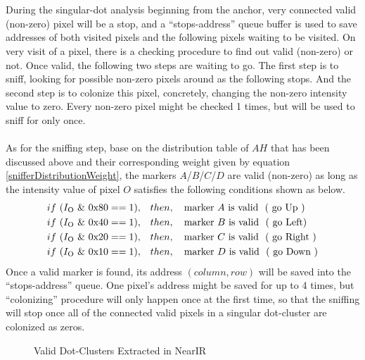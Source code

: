 \\\\%
During the singular-dot analysis beginning from the anchor, very connected valid (non-zero) pixel will be a stop, and a \enquote{stops-address} queue buffer is used to save addresses of both visited pixels and the following pixels waiting to be visited. On very visit of a pixel, there is a checking procedure to find out valid (non-zero) or not. Once valid, the following two steps are waiting to go. The first step is to sniff, looking for possible non-zero pixels around as the following stops. And the second step is to colonize this pixel, concretely, changing the non-zero intensity value to zero. Every non-zero pixel might be checked 1 times, but will be used to sniff for only once.%
\\\\%
As for the sniffing step, base on the distribution table of \(A\)\texttildelow \(H\) that has been discussed above and their corresponding weight given by equation \ref{snifferDistributionWeight}, the markers \(A\)/\(B\)/\(C\)/\(D\) are valid (non-zero) as long as the intensity value of pixel \(O\) satisfies the following conditions shown as below.%
%
\begin{equation}
%
\begin{aligned}
if \,\, ( I_{\text{O}} \,\, \& \,\, \text{0x80}  == 1 ),\quad &then, \quad \text{marker } A\,\, \text{is valid \,\,( go Up )}%
\\%
if \,\, ( I_{\text{O}} \,\, \& \,\, \text{0x40}  == 1 ),\quad &then, \quad \text{marker } B\,\, \text{is valid \,\,( go  Left)}%
\\%
if \,\, ( I_{\text{O}} \,\, \& \,\, \text{0x20}  == 1 ),\quad &then, \quad \text{marker } C\,\,\text{is valid \,\,( go Right )}%
\\%
if \,\, ( I_{\text{O}} \,\, \& \,\, \text{0x10}  == 1 ),\quad &then,\quad \text{marker } D\,\,\text{is valid \,\,( go Down )}%
\\%
\end{aligned}
%
\end{equation}%
%
Once a valid marker is found, its address \((column, row)\) will be saved into the \enquote{stops-address} queue. One pixel's address might be saved for up to 4 times, but \enquote{colonizing} procedure will only happen once at the first time, so that the sniffing will stop once all of the connected valid pixels in a singular dot-cluster are colonized as zeros.%
\par%
%
 \begin{figure}[h]
\hspace*{-0.5cm}
\centering
{}
{}
%
\caption{Valid Dot-Clusters Extracted in NearIR}
\label{DotCentersExtraction}
\end{figure}
